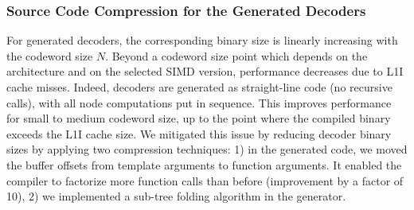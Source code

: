 \subsubsection{Source Code Compression for the Generated Decoders}


For generated decoders, the corresponding binary size is linearly increasing
with the codeword size $N$. Beyond a codeword size point which depends on the
architecture and on the selected SIMD version, performance decreases due to L1I
cache misses. Indeed, decoders are generated as straight-line code (no recursive
calls), with all node computations put in sequence. This improves performance
for small to medium codeword size, up to the point where  the compiled binary
exceeds the L1I cache size.
We mitigated this issue by reducing decoder binary sizes by applying two
compression techniques: 1) in the generated code, we moved the buffer offsets
from template arguments to function arguments. It enabled the compiler to
factorize more function calls than before (improvement by a factor of 10), 2) we
implemented a sub-tree folding algorithm in the generator.


